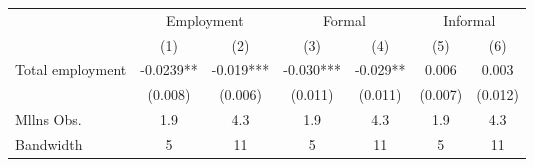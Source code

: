 


\begin{tabular}{lcccccc}

\toprule

\multicolumn{1}{l}{} &  \multicolumn{2}{c}{Employment} 
					 &  \multicolumn{2}{c}{Formal}  
					&  \multicolumn{2}{c}{Informal}  \\

\cmidrule(l{1mm}r{1mm}){2-3} \cmidrule(l{1mm}r{1mm}){4-5} \cmidrule(l{1mm}r{1mm}){6-7} 
& (1) & (2) & (3) & (4) & (5) & (6) \\
\midrule

Total employment           &  -0.0239**     &
						      -0.019***    &
						      -0.030***    &
						      -0.029**       &
						       0.006      &
						      0.003   
						   \\
						   
						&   \tiny{(0.008)}   &
						    \tiny{(0.006)}   &
						    \tiny{(0.011)}   &
						    \tiny{(0.011)}   &
						    \tiny{(0.007)}   &
						    \tiny{(0.012)}   \\

Mllns Obs.					&	1.9 &
						        4.3 &
						        1.9 &
						        4.3 &
						        1.9 &
						        4.3  \\

\midrule
{ Bandwidth}    					&	   5 &
										   11 &
										   5 &
										   11 &
										   5 &
										   11 \\

\bottomrule

\end{tabular}%


